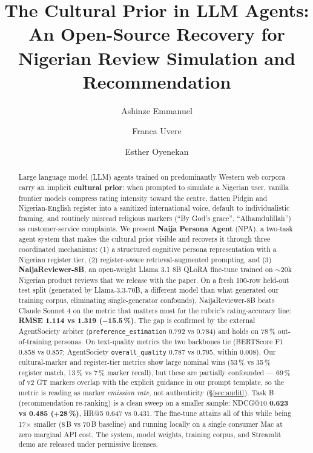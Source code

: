 \documentclass[sigconf,nonacm,balance]{acmart}
\title{The Cultural Prior in LLM Agents:\\
       An Open-Source Recovery for Nigerian Review Simulation and Recommendation}
\author{Ashinze Emmanuel}
\affiliation{\institution{International University of Applied Sciences}\country{Germany}}
\author{Franca Uvere}
\affiliation{\institution{University of Lagos}\country{Nigeria}}
\author{Esther Oyenekan}
\affiliation{\institution{MIVA Open University}\country{Nigeria}}
\begin{document}
\begin{abstract}
Large language model (LLM) agents trained on predominantly Western web corpora
carry an implicit \textbf{cultural prior}: when prompted to simulate a Nigerian
user, vanilla frontier models compress rating intensity toward the centre,
flatten Pidgin and Nigerian-English register into a sanitized international
voice, default to individualistic framing, and routinely misread religious
markers (``By God's grace'', ``Alhamdulillah'') as customer-service complaints.
We present \textbf{Naija Persona Agent} (NPA), a two-task agent system that
makes the cultural prior visible and recovers it through three coordinated
mechanisms: (1) a structured cognitive persona representation with a
Nigerian register tier, (2) register-aware retrieval-augmented prompting,
and (3) \textbf{NaijaReviewer-8B}, an open-weight Llama 3.1 8B QLoRA
fine-tune trained on \(\sim\!20\)k Nigerian product reviews that we release
with the paper. On a fresh 100-row held-out test split (generated by Llama-3.3-70B, a
different model than what generated our training corpus, eliminating
single-generator confounds), NaijaReviewer-8B beats Claude Sonnet 4 on
the metric that matters most for the rubric's rating-accuracy line:
\textbf{RMSE 1.114 vs 1.319 ($-$15.5\,\%)}. The gap is confirmed by
the external AgentSociety arbiter (\texttt{preference\_estimation}
0.792 vs 0.784) and holds on 78\,\% out-of-training personas. On
text-quality metrics the two backbones tie (BERTScore F1 0.858 vs
0.857; AgentSociety \texttt{overall\_quality} 0.787 vs 0.795, within
0.008). Our cultural-marker and register-tier metrics show large
nominal wins (53\,\% vs 35\,\% register match, 13\,\% vs 7\,\% marker
recall), but these are partially confounded --- 69\,\% of v2 GT markers
overlap with the explicit guidance in our prompt template, so the
metric is reading as marker \emph{emission rate}, not authenticity
(§\ref{sec:audit}). Task B (recommendation re-ranking) is a clean
sweep on a smaller sample: \textsf{NDCG@10} \textbf{0.623 vs 0.485
($+$28\,\%)}, \textsf{HR@5} 0.647 vs 0.431. The fine-tune attains all
of this while being 17$\times$ smaller (8\,B vs 70\,B baseline) and
running locally on a single consumer Mac at zero marginal API cost. The system, model weights,
training corpus, and Streamlit demo are released under permissive
licenses.
\end{abstract}

\maketitle
\end{document}
